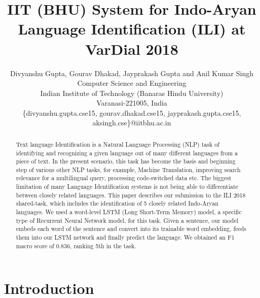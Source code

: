 \documentclass[11pt]{article}
\title{IIT (BHU) System for Indo-Aryan Language Identification (ILI) at VarDial 2018}
\author{Divyanshu Gupta, Gourav Dhakad, Jayprakash Gupta and Anil Kumar Singh \\
  Computer Science and Engineering \\
  Indian Institute of Technology (Banaras Hindu University)  \\
  Varanasi-221005, India \\
  {\{divyanshu.gupta.cse15, gourav.dhakad.cse15,  jayprakash.gupta.cse15, aksingh.cse\}@iitbhu.ac.in} \\}
\date{}
\begin{document}
\maketitle
\begin{abstract}
Text language Identification is a Natural Language Processing (NLP) task of identifying and recognizing a given language out of many different languages from a piece of text. In the present scenario, this task has become the basis and beginning step of various other NLP tasks, for example, Machine Translation, improving search relevance for a multilingual query, processing code-switched data etc. The biggest limitation of many Language Identification systems is not being able to differentiate between closely related languages. This paper describes our submission to the ILI 2018 shared-task, which includes the identification of 5 closely related Indo-Aryan languages. We used a word-level LSTM (Long Short-Term Memory) model, a specific type of Recurrent Neural Network model, for this task. Given a sentence, our model embeds each word of the sentence and convert into its trainable word embedding, feeds them into our LSTM network and finally predict the language. We obtained an F1 macro score of 0.836, ranking 5th in the task.
\end{abstract}




\section{Introduction}
\label{intro}

\end{document}
